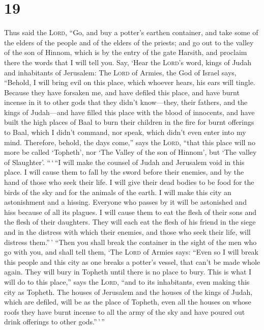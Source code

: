 \hypertarget{section-18}{%
\section{19}\label{section-18}}

 Thus said the \textsc{Lord}, ``Go, and buy a potter's
earthen container, and take some of the elders of the people and of the
elders of the priests;  and go out to the valley of the
son of Hinnom, which is by the entry of the gate Harsith, and proclaim
there the words that I will tell you.  Say, `Hear the
\textsc{Lord}'s word, kings of Judah and inhabitants of Jerusalem: The
\textsc{Lord} of Armies, the God of Israel says, ``Behold, I will bring
evil on this place, which whoever hears, his ears will tingle.
 Because they have forsaken me, and have defiled this
place, and have burnt incense in it to other gods that they didn't
know---they, their fathers, and the kings of Judah---and have filled
this place with the blood of innocents,  and have built
the high places of Baal to burn their children in the fire for burnt
offerings to Baal, which I didn't command, nor speak, which didn't even
enter into my mind.  Therefore, behold, the days come,''
says the \textsc{Lord}, ``that this place will no more be called
`Topheth', nor `The Valley of the son of Hinnom', but `The valley of
Slaughter'.  ``\,`\,``I will make the counsel of Judah and
Jerusalem void in this place. I will cause them to fall by the sword
before their enemies, and by the hand of those who seek their life. I
will give their dead bodies to be food for the birds of the sky and for
the animals of the earth.  I will make this city an
astonishment and a hissing. Everyone who passes by it will be astonished
and hiss because of all its plagues.  I will cause them to
eat the flesh of their sons and the flesh of their daughters. They will
each eat the flesh of his friend in the siege and in the distress with
which their enemies, and those who seek their life, will distress
them.''\,'  ``Then you shall break the container in the
sight of the men who go with you,  and shall tell them,
`The \textsc{Lord} of Armies says: ``Even so I will break this people
and this city as one breaks a potter's vessel, that can't be made whole
again. They will bury in Topheth until there is no place to bury.
 This is what I will do to this place,'' says the
\textsc{Lord}, ``and to its inhabitants, even making this city as
Topheth.  The houses of Jerusalem and the houses of the
kings of Judah, which are defiled, will be as the place of Topheth, even
all the houses on whose roofs they have burnt incense to all the army of
the sky and have poured out drink offerings to other gods.''\,'\,''

